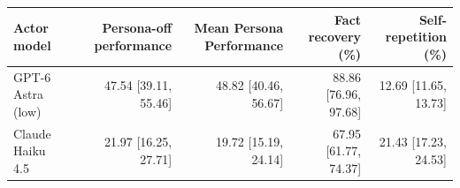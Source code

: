 \begin{tabular}{lrrrr}
\hline
Actor model & Persona-off performance & Mean Persona Performance & Fact recovery (\%) & Self-repetition (\%) \\
\hline
GPT-6 Astra (low) & 47.54 [39.11, 55.46] & 48.82 [40.46, 56.67] & 88.86 [76.96, 97.68] & 12.69 [11.65, 13.73] \\
Claude Haiku 4.5 & 21.97 [16.25, 27.71] & 19.72 [15.19, 24.14] & 67.95 [61.77, 74.37] & 21.43 [17.23, 24.53] \\
\hline
\end{tabular}
